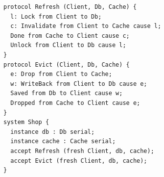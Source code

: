 \begin{lstlisting}[language={},basicstyle=\ttfamily\scriptsize,breaklines=true]
protocol Refresh (Client, Db, Cache) {
  l: Lock from Client to Db;
  c: Invalidate from Client to Cache cause l;
  Done from Cache to Client cause c;
  Unlock from Client to Db cause l;
}
protocol Evict (Client, Db, Cache) {
  e: Drop from Client to Cache;
  w: WriteBack from Client to Db cause e;
  Saved from Db to Client cause w;
  Dropped from Cache to Client cause e;
}
system Shop {
  instance db : Db serial;
  instance cache : Cache serial;
  accept Refresh (fresh Client, db, cache);
  accept Evict (fresh Client, db, cache);
}
\end{lstlisting}
